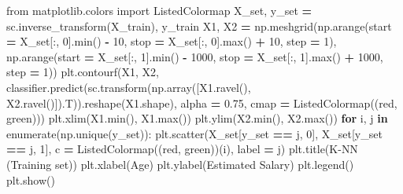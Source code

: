 \documentclass[
]{book}
\newenvironment{Shaded}{\begin{snugshade}}{\end{snugshade}}
\newcommand{\BuiltInTok}[1]{#1}
\newcommand{\ControlFlowTok}[1]{\textcolor[rgb]{0.13,0.29,0.53}{\textbf{#1}}}
\newcommand{\DecValTok}[1]{\textcolor[rgb]{0.00,0.00,0.81}{#1}}
\newcommand{\FloatTok}[1]{\textcolor[rgb]{0.00,0.00,0.81}{#1}}
\newcommand{\ImportTok}[1]{#1}
\newcommand{\KeywordTok}[1]{\textcolor[rgb]{0.13,0.29,0.53}{\textbf{#1}}}
\newcommand{\NormalTok}[1]{#1}
\newcommand{\OperatorTok}[1]{\textcolor[rgb]{0.81,0.36,0.00}{\textbf{#1}}}
\newcommand{\StringTok}[1]{\textcolor[rgb]{0.31,0.60,0.02}{#1}}
\theoremstyle{definition}
\theoremstyle{definition}
\theoremstyle{definition}
\theoremstyle{definition}
\theoremstyle{remark}
\begin{document}
\begin{Shaded}
\begin{Highlighting}[]
\ImportTok{from}\NormalTok{ matplotlib.colors }\ImportTok{import}\NormalTok{ ListedColormap}
\NormalTok{X\_set, y\_set }\OperatorTok{=}\NormalTok{ sc.inverse\_transform(X\_train), y\_train}
\NormalTok{X1, X2 }\OperatorTok{=}\NormalTok{ np.meshgrid(np.arange(start }\OperatorTok{=}\NormalTok{ X\_set[:, }\DecValTok{0}\NormalTok{].}\BuiltInTok{min}\NormalTok{() }\OperatorTok{{-}} \DecValTok{10}\NormalTok{, stop }\OperatorTok{=}\NormalTok{ X\_set[:, }\DecValTok{0}\NormalTok{].}\BuiltInTok{max}\NormalTok{() }\OperatorTok{+} \DecValTok{10}\NormalTok{, step }\OperatorTok{=} \DecValTok{1}\NormalTok{),}
\NormalTok{                     np.arange(start }\OperatorTok{=}\NormalTok{ X\_set[:, }\DecValTok{1}\NormalTok{].}\BuiltInTok{min}\NormalTok{() }\OperatorTok{{-}} \DecValTok{1000}\NormalTok{, stop }\OperatorTok{=}\NormalTok{ X\_set[:, }\DecValTok{1}\NormalTok{].}\BuiltInTok{max}\NormalTok{() }\OperatorTok{+} \DecValTok{1000}\NormalTok{, step }\OperatorTok{=} \DecValTok{1}\NormalTok{))}
\NormalTok{plt.contourf(X1, X2, classifier.predict(sc.transform(np.array([X1.ravel(), X2.ravel()]).T)).reshape(X1.shape),}
\NormalTok{             alpha }\OperatorTok{=} \FloatTok{0.75}\NormalTok{, cmap }\OperatorTok{=}\NormalTok{ ListedColormap((}\StringTok{\textquotesingle{}red\textquotesingle{}}\NormalTok{, }\StringTok{\textquotesingle{}green\textquotesingle{}}\NormalTok{)))}
\NormalTok{plt.xlim(X1.}\BuiltInTok{min}\NormalTok{(), X1.}\BuiltInTok{max}\NormalTok{())}
\NormalTok{plt.ylim(X2.}\BuiltInTok{min}\NormalTok{(), X2.}\BuiltInTok{max}\NormalTok{())}
\ControlFlowTok{for}\NormalTok{ i, j }\KeywordTok{in} \BuiltInTok{enumerate}\NormalTok{(np.unique(y\_set)):}
\NormalTok{    plt.scatter(X\_set[y\_set }\OperatorTok{==}\NormalTok{ j, }\DecValTok{0}\NormalTok{], X\_set[y\_set }\OperatorTok{==}\NormalTok{ j, }\DecValTok{1}\NormalTok{], c }\OperatorTok{=}\NormalTok{ ListedColormap((}\StringTok{\textquotesingle{}red\textquotesingle{}}\NormalTok{, }\StringTok{\textquotesingle{}green\textquotesingle{}}\NormalTok{))(i), label }\OperatorTok{=}\NormalTok{ j)}
\NormalTok{plt.title(}\StringTok{\textquotesingle{}K{-}NN (Training set)\textquotesingle{}}\NormalTok{)}
\NormalTok{plt.xlabel(}\StringTok{\textquotesingle{}Age\textquotesingle{}}\NormalTok{)}
\NormalTok{plt.ylabel(}\StringTok{\textquotesingle{}Estimated Salary\textquotesingle{}}\NormalTok{)}
\NormalTok{plt.legend()}
\NormalTok{plt.show()}
\end{Highlighting}
\end{Shaded}
\end{document}
